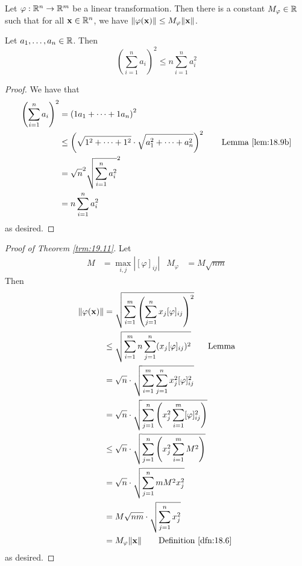 \documentclass[../main.tex]{subfiles}
\begin{document}
\begin{theorem}\label{trm:19.11}
    Let $\varphi:\mathbb{R}^n\to\mathbb{R}^m$ be a linear transformation. Then there is a constant $M_\varphi\in\mathbb{R}$ such that for all $\mathbf{x}\in\mathbb{R}^n$, we have $\norm{\varphi(\mathbf{x})}\leq M_\varphi\norm{\mathbf{x}}$.
    \begin{lemma*}\leavevmode
        Let $a_1,\dots,a_n\in\mathbb{R}$. Then
        \begin{equation*}
            \left( \sum_{i=1}^na_i \right)^2 \leq n\sum_{i=1}^na_i^2
        \end{equation*}
        \begin{proof}[Proof]
            We have that
            \begin{align*}
                \left( \sum_{i=1}^na_i \right)^2 &= \left( 1a_1+\cdots+1a_n \right)^2\\
                &\leq \left( \sqrt{1^2+\cdots+1^2}\cdot\sqrt{a_1^2+\cdots+a_n^2} \right)^2\tag*{Lemma \ref{lem:18.9b}}\\
                &= \sqrt{n}^2\sqrt{\sum_{i=1}^na_i^2}^2\\
                &= n\sum_{i=1}^na_i^2
            \end{align*}
            as desired.
        \end{proof}
    \end{lemma*}
    \begin{proof}[Proof of Theorem \ref{trm:19.11}]
        Let
        \begin{align*}
            M &= \max_{i,j}|[\varphi]_{ij}|&
            M_\varphi &= M\sqrt{nm}
        \end{align*}
        Then
        \begin{align*}
            \norm{\varphi(\x)} &= \sqrt{\sum_{i=1}^m\left( \sum_{j=1}^nx_j[\varphi]_{ij} \right)^2}\\
            &\leq \sqrt{\sum_{i=1}^mn\sum_{j=1}^n(x_j[\varphi]_{ij})^2}\tag*{Lemma}\\
            &= \sqrt{n}\cdot\sqrt{\sum_{i=1}^m\sum_{j=1}^nx_j^2[\varphi]_{ij}^2}\\
            &= \sqrt{n}\cdot\sqrt{\sum_{j=1}^n\left( x_j^2\sum_{i=1}^m[\varphi]_{ij}^2 \right)}\\
            &\leq \sqrt{n}\cdot\sqrt{\sum_{j=1}^n\left( x_j^2\sum_{i=1}^mM^2 \right)}\\
            &= \sqrt{n}\cdot\sqrt{\sum_{j=1}^nmM^2x_j^2}\\
            &= M\sqrt{nm}\cdot\sqrt{\sum_{j=1}^nx_j^2}\\
            &= M_\varphi\norm{\x}\tag*{Definition \ref{dfn:18.6}}
        \end{align*}
        as desired.
    \end{proof}
\end{theorem}
\end{document}
